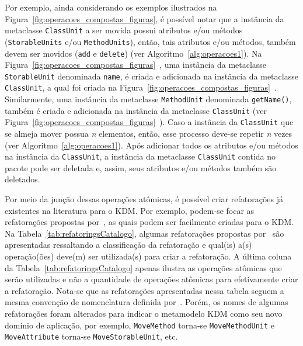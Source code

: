 Por exemplo, ainda considerando os exemplos ilustrados na Figura~\ref{fig:operacoes_compostas_figuras}, é possível notar que a instância da metaclasse \texttt{ClassUnit} a ser movida possui atributos e/ou métodos (\texttt{StorableUnits} e/ou \texttt{MethodUnits}), então, tais atributos e/ou métodos, também devem ser movidos (\texttt{add} e \texttt{delete}) (ver Algoritmo~\ref{alg:operacoes1}). Na Figura~\ref{fig:operacoes_compostas_figuras}~, uma instância da metaclasse \texttt{StorableUnit} denominada \texttt{name}, é criada e adicionada na instância da metaclasse \texttt{ClassUnit}, a qual foi criada na Figura~\ref{fig:operacoes_compostas_figuras}~. Similarmente, uma instância da metaclasse \texttt{MethodUnit} denominada \texttt{getName()}, também é criada e adicionada na instância da metaclasse \texttt{ClassUnit} (ver Figura~\ref{fig:operacoes_compostas_figuras}~). Caso a instância da \texttt{ClassUnit} que se almeja mover possua \textit{n} elementos, então, esse processo deve-se repetir \textit{n} vezes (ver Algoritmo~\ref{alg:operacoes1}). Após adicionar todos os atributos e/ou métodos na instância da \texttt{ClassUnit}, a instância da metaclasse \texttt{ClassUnit} contida no pacote  pode ser deletada e, assim, seus atributos e/ou métodos também são deletados.



Por meio da junção dessas operações atômicas, é possível criar refatorações já existentes na literatura para o KDM. Por exemplo, podem-se focar as refatorações propostas por~, as quais podem ser facilmente criadas para o KDM. Na Tabela~\ref{tab:refatoringsCatalogo}, algumas refatorações propostas por~ são apresentadas ressaltando a classificação da refatoração e qual(is) a(s) operação(ões) deve(m) ser utilizada(s) para criar a refatoração. A última coluna da Tabela~\ref{tab:refatoringsCatalogo} apenas ilustra as operações atômicas que serão utilizadas e não a quantidade de operações atômicas para efetivamente criar a refatoração. Nota-se que as refatorações apresentadas nessa tabela seguem a mesma convenção de nomenclatura definida por~. Porém, os nomes de algumas refatorações foram alterados para indicar o metamodelo KDM como seu novo domínio de aplicação, por exemplo, \texttt{MoveMethod} torna-se \texttt{MoveMethodUnit} e \texttt{MoveAttribute} torna-se \texttt{MoveStorableUnit}, etc.


